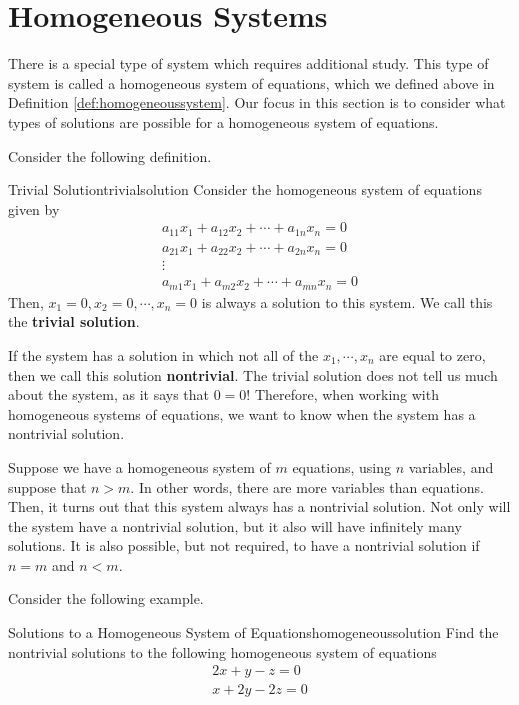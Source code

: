 \section{Homogeneous Systems}

There is a special type of system which requires additional study. This type of system is called a homogeneous system of
equations, which we defined above in Definition \ref{def:homogeneoussystem}. 
Our focus in this section is to consider what types of solutions are possible for a homogeneous system of equations. 

Consider the following definition. 

\begin{definition}{Trivial Solution}{trivialsolution}
Consider the homogeneous system of equations given by
\begin{equation*}
\begin{array}{c}
a_{11}x_{1}+a_{12}x_{2}+\cdots +a_{1n}x_{n}= 0 \\
a_{21}x_{1}+a_{22}x_{2}+\cdots +a_{2n}x_{n}= 0  \\
\vdots \\
a_{m1}x_{1}+a_{m2}x_{2}+\cdots +a_{mn}x_{n}= 0 
\end{array}
\end{equation*}
Then, $x_{1} = 0, x_{2} = 0, \cdots, x_{n} =0$ is always a 
solution to this system. We call this the \textbf{trivial solution}.
\end{definition}

If the system has a solution in which not all of the $x_1, \cdots, x_n$ are equal to zero,
then we call this solution \textbf{nontrivial}. The trivial solution
does not tell us much about the system, as it says that $0=0$! 
Therefore, when working with homogeneous systems of 
equations, we want to know when the system has a nontrivial solution. 

Suppose we have a homogeneous system of $m$ equations, using $n$ variables, and suppose that
$n > m$. In other words, there are more variables than equations. 
Then, it turns out that this system always has a nontrivial solution. Not only will the
system have a nontrivial solution, but it also will have infinitely many solutions.
It is also possible, but not required, to have a nontrivial solution if $n=m$ and $n<m$.

Consider the following example.

\begin{example}{Solutions to a Homogeneous System of Equations}{homogeneoussolution}
Find the nontrivial solutions to the following homogeneous system of equations
\begin{equation*}
\begin{array}{c}
2x + y - z = 0 \\
x + 2y - 2z = 0
\end{array}
\end{equation*}
\end{example}


